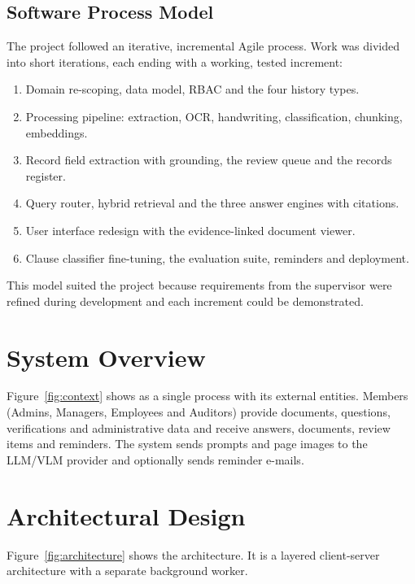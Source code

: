 \subsection{Software Process Model}
The project followed an iterative, incremental Agile process. Work was divided into short iterations,
each ending with a working, tested increment:
\begin{enumerate}
\item Domain re-scoping, data model, RBAC and the four history types.
\item Processing pipeline: extraction, OCR, handwriting, classification, chunking, embeddings.
\item Record field extraction with grounding, the review queue and the records register.
\item Query router, hybrid retrieval and the three answer engines with citations.
\item User interface redesign with the evidence-linked document viewer.
\item Clause classifier fine-tuning, the evaluation suite, reminders and deployment.
\end{enumerate}
This model suited the project because requirements from the supervisor were refined during
development and each increment could be demonstrated.

\section{System Overview}
Figure~\ref{fig:context} shows \sysname{} as a single process with its external entities. Members
(Admins, Managers, Employees and Auditors) provide documents, questions, verifications and
administrative data and receive answers, documents, review items and reminders. The system sends
prompts and page images to the LLM/VLM provider and optionally sends reminder e-mails.


\section{Architectural Design}
Figure~\ref{fig:architecture} shows the architecture. It is a layered client-server architecture with a
separate background worker.


